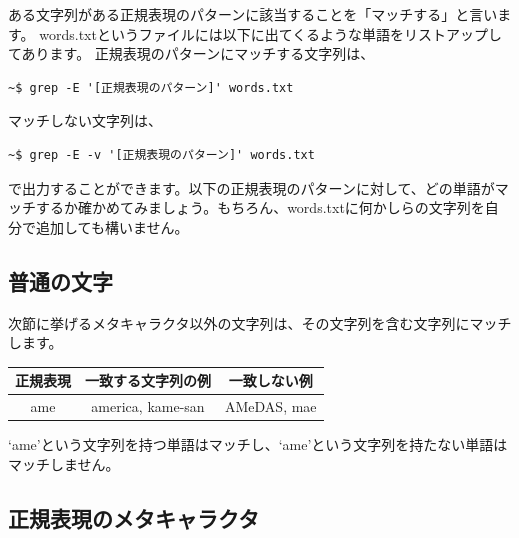 \documentclass[a4j]{ltjreport}
\begin{document}
    ある文字列がある正規表現のパターンに該当することを「マッチする」と言います。
    words.txtというファイルには以下に出てくるような単語をリストアップしてあります。
    正規表現のパターンにマッチする文字列は、
    \begin{lstlisting}[numbers=none]
        ~$ grep -E '[正規表現のパターン]' words.txt
    \end{lstlisting}
    マッチしない文字列は、
    \begin{lstlisting}[numbers=none]
        ~$ grep -E -v '[正規表現のパターン]' words.txt
    \end{lstlisting}
    で出力することができます。以下の正規表現のパターンに対して、どの単語がマッチするか確かめてみましょう。もちろん、words.txtに何かしらの文字列を自分で追加しても構いません。

    \subsection{普通の文字}
    次節に挙げるメタキャラクタ以外の文字列は、その文字列を含む文字列にマッチします。

    \begin{table}[h]
        \centering
        \begin{tabular}{|c|c|c|}
            \hline
            正規表現 & 一致する文字列の例 & 一致しない例 \\
            \hline\hline
            ame & america, kame-san & AMeDAS, mae \\
            \hline
        \end{tabular}
    \end{table}
    `ame'という文字列を持つ単語はマッチし、`ame'という文字列を持たない単語はマッチしません。

    \subsection{正規表現のメタキャラクタ}
\end{document}
